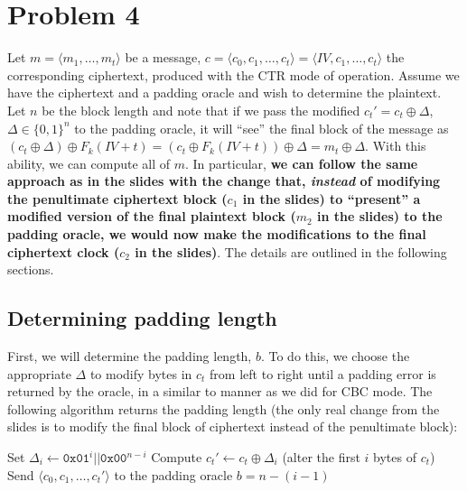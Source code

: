\documentclass[12pt]{article}
\numberwithin{equation}{section}
\theoremstyle{plain}
\newcommand{\set}[1]{\{ #1 \}}
\begin{document}
\section*{Problem 4}

Let $m = \langle m_1, \ldots, m_t \rangle$ be a message,
$c = \langle c_0, c_1, \ldots, c_t \rangle = \langle IV, c_1, \ldots, c_t \rangle$ the corresponding ciphertext,
produced with the CTR mode of operation.
Assume we have the ciphertext and a padding oracle and wish to determine the plaintext.
Let $n$ be the block length and note that if we pass the modified $c_t' = c_t \oplus \Delta$,
$\Delta \in \set{ 0, 1 }^n$ to the padding oracle,
it will ``see'' the final block of the message as $(c_t \oplus \Delta) \oplus F_k(IV + t) = (c_t \oplus F_k(IV + t)) \oplus \Delta = m_t \oplus \Delta$.
With this ability, we can compute all of $m$.
In particular, \textbf{we can follow the same approach as in the slides with the change that,
\textit{instead} of modifying the penultimate ciphertext block ($c_1$ in the slides)
to ``present'' a modified version of the final plaintext block ($m_2$ in the slides) to the padding oracle,
we would now make the modifications to the final ciphertext clock ($c_2$ in the slides)}.
The details are outlined in the following sections.

\pagebreak

\subsection*{Determining padding length}

First, we will determine the padding length, $b$.
To do this, we choose the appropriate $\Delta$ to modify bytes in $c_t$ from left to right until a padding error is returned by the oracle,
in a similar to manner as we did for CBC mode.
The following algorithm returns the padding length
(the only real change from the slides is to modify the final block of ciphertext instead of the penultimate block):
\begin{algorithm}[H]
\begin{algorithmic}
    \For{$i \in \set{ 1, \ldots, n }$}
        \State Set $\Delta_i \gets \texttt{0x01}^i || \texttt{0x00}^{n - i}$
        \State Compute $c_t' \gets c_t \oplus \Delta_i$ (alter the first $i$ bytes of $c_t$)
        \State Send $\langle c_0, c_1, \ldots, c_t' \rangle$ to the padding oracle
            \State \Return $b = n - (i - 1)$
        \EndIf
    \EndFor
\EndProcedure
\end{algorithmic}
\end{algorithm}
\end{document}
